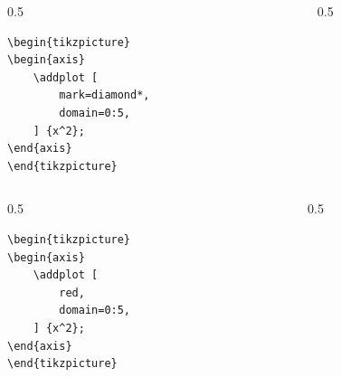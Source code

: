 \documentclass[12pt,aspectratio=169,ignorenonframetext]{ltxbeamer}
\begin{document}
\begin{frame}[fragile]
\begin{columns}
    \begin{column}{0.5\textwidth}
        \begin{verbatim}
\begin{tikzpicture}
\begin{axis}
    \addplot [
        mark=diamond*,
        domain=0:5,
    ] {x^2};
\end{axis}
\end{tikzpicture}
        \end{verbatim}
    \end{column}
    {\color{gray} \vline}
    \begin{column}{0.5\textwidth}
    \end{column}
\end{columns}
\end{frame}





\begin{frame}[fragile]
\begin{columns}
    \begin{column}{0.5\textwidth}
        \begin{verbatim}
\begin{tikzpicture}
\begin{axis}
    \addplot [
        red,
        domain=0:5,
    ] {x^2};
\end{axis}
\end{tikzpicture}
        \end{verbatim}
    \end{column}
    {\color{gray} \vline}
    \begin{column}{0.5\textwidth}
    \end{column}
\end{columns}
\end{frame}
\end{document}
